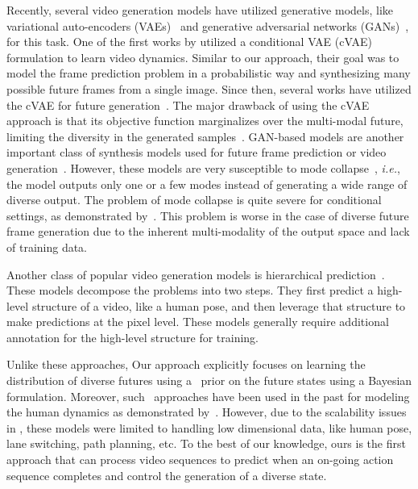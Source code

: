 \documentclass{article} \usepackage{iclr2021_conference,times}
\newcommand{\GP}{}
\def\ie{\emph{i.e.}}
\begin{document}
Recently, several video generation models have utilized generative models, like variational auto-encoders (VAEs)~\citep{Kingma2013AutoEncodingVB} and generative adversarial networks (GANs)~\citep{goodfellow2014generative}, for this task. One of the first works by \citet{visualdynamics16} utilized a conditional VAE (cVAE) formulation to learn video dynamics. Similar to our approach, their goal was to model the frame prediction problem in a probabilistic way and synthesizing many possible future frames from a single image. Since then, several works have utilized the cVAE for future generation~\citep{babaeizadeh2017stochastic,denton2018stochastic}. The major drawback of using the cVAE approach is that its objective function marginalizes over the multi-modal future, limiting the diversity in the generated samples~\citep{Bhattacharyya_2018}. GAN-based models are another important class of synthesis models used for future frame prediction or video generation~\citep{Vondrick2017GeneratingTF,Lu2017FlexibleSN,Vondrick2016GeneratingVW,Saito_2017,Tulyakov_2018,Hu_2019_ICCV}. However, these models are very susceptible to mode collapse~\citep{salimans2016improved}, \ie, the model outputs only one or a few modes instead of generating a wide range of diverse output. The problem of mode collapse is quite severe for conditional settings, as demonstrated by~\citep{Isola2016ImagetoImageTW,zhu2017multimodal,mathieu2015deep}. This problem is worse in the case of diverse future frame generation due to the inherent multi-modality of the output space and lack of training data. 

Another class of popular video generation models is hierarchical prediction~\citep{pos_iccv2017,villegas2017learning,wichers2018hierarchical,Cai_2018}. These models decompose the problems into two steps. They first predict a high-level structure of a video, like a human pose, and then leverage that structure to make predictions at the pixel level. These models generally require additional annotation for the high-level structure for training.

Unlike these approaches, Our approach explicitly focuses on learning the distribution of diverse futures using a \GP\ prior on the future states using a Bayesian formulation. Moreover, such \GP\ approaches have been used in the past for modeling the human dynamics as demonstrated by~\citep{4359316,6859020,4562106}. However, due to the scalability issues in \GP, these models were limited to handling low dimensional data, like human pose, lane switching, path planning, etc. To the best of our knowledge, ours is the first approach that can process video sequences to predict when an on-going action sequence completes and control the generation of a diverse state.
\end{document}
